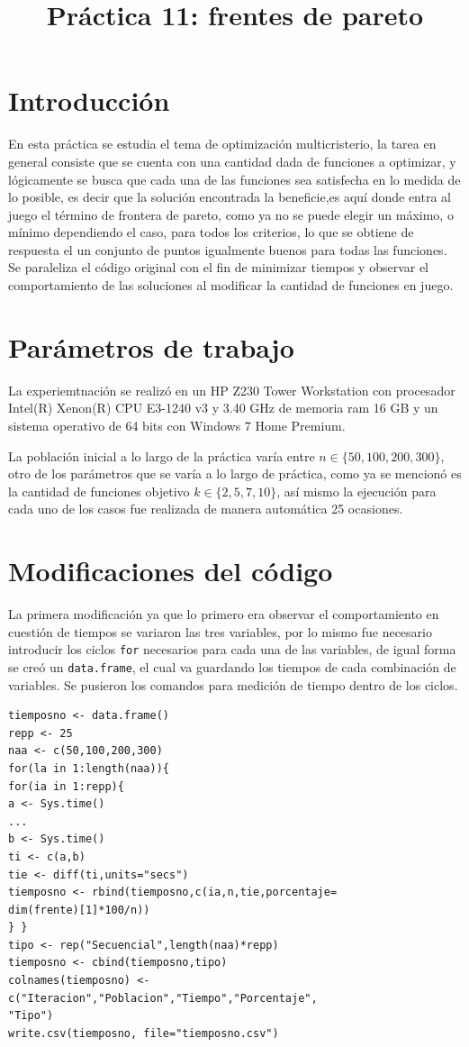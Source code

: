 \documentclass[a4paper]{article}
\title{Práctica 11: frentes de pareto}
\begin{document}
\maketitle

\section{Introducci\'on}
En esta práctica se estudia el tema de optimización multicristerio, la tarea en general consiste que se cuenta con una cantidad dada de funciones a optimizar, y lógicamente se busca que cada una de las funciones sea satisfecha en lo medida de lo posible, es decir que la solución encontrada la beneficie,es aquí donde entra al juego el término de frontera de pareto, como ya no se puede elegir un máximo, o mínimo dependiendo el caso, para todos los criterios, lo que se obtiene de respuesta el un conjunto de puntos igualmente buenos para todas las funciones. Se paraleliza el código original con el fin de minimizar tiempos y observar el comportamiento de las soluciones al modificar la cantidad de funciones en juego.

\section{Par\'ametros de trabajo}
La experiemtnación se realizó en un HP Z230 Tower Workstation con procesador Intel(R) Xenon(R) CPU E3-1240 v3 y 3.40 GHz de memoria ram 16 GB y un sistema operativo de 64 bits con Windows 7 Home Premium.

La población inicial a lo largo de la práctica varía entre $n\in\{50,100,200,300\}$, otro de los parámetros que se varía a lo largo de práctica, como ya se mencionó es la cantidad de funciones objetivo $k\in\{2,5,7,10\}$, así mismo la ejecución para cada uno de los casos fue realizada de manera automática 25 ocasiones.


\section{Modificaciones del código}
La primera modificación ya que lo primero era observar el comportamiento en cuestión de tiempos se variaron las tres variables, por lo mismo fue necesario introducir los ciclos \texttt{for} necesarios para cada una de las variables, de igual forma se creó un \texttt{data.frame}, el cual va guardando los tiempos de cada combinación de variables. Se pusieron los comandos para medición de tiempo dentro de los ciclos.
\begin{lstlisting}[frame=single]
tiemposno <- data.frame()
repp <- 25
naa <- c(50,100,200,300)
for(la in 1:length(naa)){
for(ia in 1:repp){
a <- Sys.time()
...
b <- Sys.time()
ti <- c(a,b)
tie <- diff(ti,units="secs")
tiemposno <- rbind(tiemposno,c(ia,n,tie,porcentaje=
dim(frente)[1]*100/n))
} }
tipo <- rep("Secuencial",length(naa)*repp)
tiemposno <- cbind(tiemposno,tipo)
colnames(tiemposno) <- c("Iteracion","Poblacion","Tiempo","Porcentaje",
"Tipo")
write.csv(tiemposno, file="tiemposno.csv")
\end{lstlisting}
\end{document}
